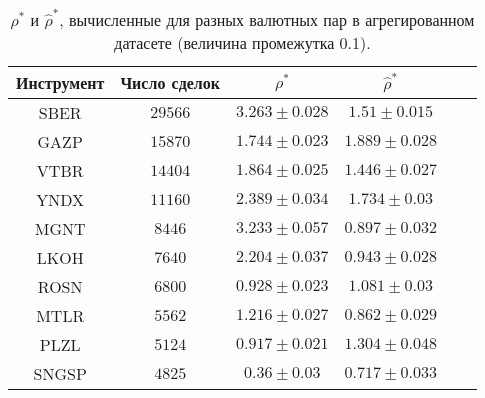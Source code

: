 \begin{table}[h!]
    \begin{center}
        \begin{tabular}{|c|c|c|c|c|c|}
            \hline
            Инструмент & Число сделок & $\rho^*$ & $\hat \rho^*$            \\ \hline
            SBER & $29566$ & $3.263 \pm 0.028$ & $1.51 \pm 0.015$ \\ \hline
            GAZP       & $15870$      & $1.744 \pm 0.023$ & $1.889 \pm 0.028$ \\ \hline
            VTBR       & $14404$      & $1.864 \pm 0.025$ & $1.446 \pm 0.027$ \\ \hline
            YNDX       & $11160$      & $2.389 \pm 0.034$ & $1.734 \pm 0.03$  \\ \hline
            MGNT       & $8446$       & $3.233 \pm 0.057$ & $0.897 \pm 0.032$ \\ \hline
            LKOH       & $7640$       & $2.204 \pm 0.037$ & $0.943 \pm 0.028$ \\ \hline
            ROSN       & $6800$       & $0.928 \pm 0.023$ & $1.081 \pm 0.03$  \\ \hline
            MTLR       & $5562$       & $1.216 \pm 0.027$ & $0.862 \pm 0.029$ \\ \hline
            PLZL       & $5124$       & $0.917 \pm 0.021$ & $1.304 \pm 0.048$ \\ \hline
            SNGSP      & $4825$       & $0.36 \pm 0.03$   & $0.717 \pm 0.033$ \\ \hline
        \end{tabular}
    \end{center}\caption{$\rho^*$ и $\hat \rho^*$, вычисленные для разных валютных пар в агрегированном датасете (величина промежутка 0.1).}
    \label{Aggreg1CU0.1} \end{table}

